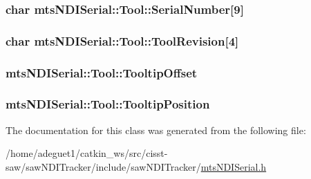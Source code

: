 \hypertarget{classmts_n_d_i_serial_1_1_tool_a454c6a43d24c1b0e50ff94b3f43e272a}{
\subsubsection[{Serial\-Number}]{\setlength{\rightskip}{0pt plus 5cm}char mts\-N\-D\-I\-Serial\-::\-Tool\-::\-Serial\-Number\mbox{[}9\mbox{]}}}\label{classmts_n_d_i_serial_1_1_tool_a454c6a43d24c1b0e50ff94b3f43e272a}
\hypertarget{classmts_n_d_i_serial_1_1_tool_aadd9c102dca4f53e5ea50188ddebc9e0}{
\subsubsection[{Tool\-Revision}]{\setlength{\rightskip}{0pt plus 5cm}char mts\-N\-D\-I\-Serial\-::\-Tool\-::\-Tool\-Revision\mbox{[}4\mbox{]}}}\label{classmts_n_d_i_serial_1_1_tool_aadd9c102dca4f53e5ea50188ddebc9e0}
\hypertarget{classmts_n_d_i_serial_1_1_tool_aa8acfe8b5a76a1fc7816233d6f853049}{
\subsubsection[{Tooltip\-Offset}]{ mts\-N\-D\-I\-Serial\-::\-Tool\-::\-Tooltip\-Offset}}\label{classmts_n_d_i_serial_1_1_tool_aa8acfe8b5a76a1fc7816233d6f853049}
\hypertarget{classmts_n_d_i_serial_1_1_tool_aef4e9c123a79afda4c764d27faeac338}{
\subsubsection[{Tooltip\-Position}]{ mts\-N\-D\-I\-Serial\-::\-Tool\-::\-Tooltip\-Position}}\label{classmts_n_d_i_serial_1_1_tool_aef4e9c123a79afda4c764d27faeac338}


The documentation for this class was generated from the following file\-:\begin{DoxyCompactItemize}
\item 
/home/adeguet1/catkin\-\_\-ws/src/cisst-\/saw/saw\-N\-D\-I\-Tracker/include/saw\-N\-D\-I\-Tracker/\hyperlink{mts_n_d_i_serial_8h}{mts\-N\-D\-I\-Serial.\-h}\end{DoxyCompactItemize}
